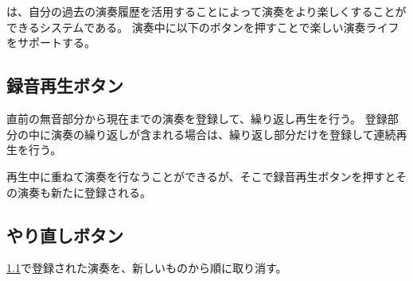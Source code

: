 \section{\system}
\label{repiano}

{\system}は、自分の過去の演奏履歴を活用することによって演奏をより楽しくすることができるシステムである。
演奏中に以下のボタンを押すことで楽しい演奏ライフをサポートする。

\subsection{録音再生ボタン}
\label{recplaybutton}
直前の無音部分から現在までの演奏を登録して、繰り返し再生を行う。
登録部分の中に演奏の繰り返しが含まれる場合は、繰り返し部分だけを登録して連続再生を行う。

再生中に重ねて演奏を行なうことができるが、そこで録音再生ボタンを押すとその演奏も新たに登録される。

\subsection{やり直しボタン}
\ref{recplaybutton}で登録された演奏を、新しいものから順に取り消す。

